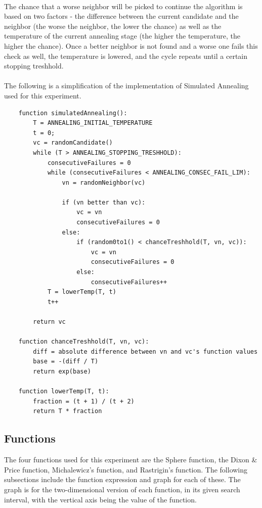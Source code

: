 \documentclass{article}
\begin{document}
    \paragraph{}
    The chance that a worse neighbor will be picked to continue the algorithm is based on two factors - the difference between the current candidate and the neighbor (the worse the neighbor, the lower the chance) as well as the temperature of the current annealing stage (the higher the temperature, the higher the chance). Once a better neighbor is not found and a worse one fails this check as well, the temperature is lowered, and the cycle repeats until a certain stopping treshhold.

    \paragraph{}
    The following is a simplification of the implementation of Simulated Annealing used for this experiment.

    \begin{verbatim}
    function simulatedAnnealing():
        T = ANNEALING_INITIAL_TEMPERATURE
        t = 0;
        vc = randomCandidate()
        while (T > ANNEALING_STOPPING_TRESHHOLD):
            consecutiveFailures = 0
            while (consecutiveFailures < ANNEALING_CONSEC_FAIL_LIM):
                vn = randomNeighbor(vc)

                if (vn better than vc):
                    vc = vn
                    consecutiveFailures = 0
                else:
                    if (random0to1() < chanceTreshhold(T, vn, vc)):
                        vc = vn
                        consecutiveFailures = 0
                    else:
                        consecutiveFailures++
            T = lowerTemp(T, t)
            t++
        
        return vc

    function chanceTreshhold(T, vn, vc):
        diff = absolute difference between vn and vc's function values
        base = -(diff / T)
        return exp(base)
    
    function lowerTemp(T, t):
        fraction = (t + 1) / (t + 2)
        return T * fraction
    \end{verbatim}
    
	\subsection{Functions}
	The four functions used for this experiment are the Sphere function, the Dixon \& Price function, Michalewicz's function, and Rastrigin's function. The following subsections include the function expression and graph for each of these. The graph is for the two-dimensional version of each function, in its given search interval, with the vertical axis being the value of the function.
\end{document}
